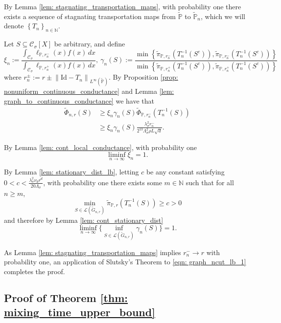 \documentclass[11pt,twoside]{article}
\newcommand{\set}[1]{\left\{#1\right\}}
\newcommand{\seq}[1]{\left\{#1\right\}_{n \in \mathbb{N}}}
\newcommand{\norm}[1]{\left\lVert#1\right\rVert}
\newcommand{\1}{\mathbf{1}}
\newcommand{\Xbf}{X}             %
\newcommand{\Pbb}{\mathbb{P}}
\newcommand{\Cset}{\mathcal{C}}
\newcommand{\Csig}{\Cset_{\sigma}}
\newcommand{\dx}{\,dx}
\newcommand{\piwt}{\widetilde{\pi}}
\begin{document}
By Lemma \ref{lem: stagnating_transportation_maps}, with probability one there exists a sequence of stagnating transportation maps from $\widetilde{\Pbb}$ to $\widetilde{\Pbb}_n$, which we will denote $\seq{T_n}$. 

Let $S \subseteq \Csig[\Xbf]$ be arbitrary, and define
\begin{equation*}
\xi_n := \frac{\int_{\Csig} \ell_{\Pbb,r_n^-}(x) f(x) \dx}{\int_{\Csig} \ell_{\Pbb,r_n^+}(x) f(x) \dx},~ \gamma_n(S) := \frac{\min \set{\piwt_{\Pbb,r_n^-}(T_n^{-1}(S^c)), \piwt_{\Pbb,r_n^-}(T_n^{-1}(S^c))} }{\min \set{\piwt_{\Pbb,r_n^+}(T_n^{-1}(S^c)), \piwt_{\Pbb,r_n^+}(T_n^{-1}(S^c))} } 
\end{equation*}
where $r_n^{\pm} := r \pm \norm{\mathrm{Id} - T_n}_{L^{\infty}(\widetilde{\Pbb})}$. By Proposition \ref{prop: nonuniform_continuous_conductance} and Lemma \ref{lem: graph_to_continuous_conductance} we have that
\begin{align}
\widetilde{\Phi}_{n,r}(S) & \geq \xi_n \gamma_n(S) \widetilde{\Phi}_{\Pbb,r_n^{-}}(T_n^{-1}(S)) \nonumber \\
& \geq  \xi_n \gamma_n(S) \frac{\lambda_{\sigma}^2r_n^{-}}{2^{13} \Lambda_{\sigma}^2 \rho L \sqrt{d}}. \label{eqn: graph_ncut_lb_1}
\end{align}

By Lemma \ref{lem: cont_local_conductance}, with probability one
\begin{equation*}
\liminf_{n \to \infty} \xi_n = 1.
\end{equation*}

By Lemma \ref{lem: stationary_dist_lb}, letting $c$ be any constant satisfying $0 < c < \frac{\lambda_{\sigma}^2 \nu_d r^d}{20\Lambda_{\sigma}}$, with probability one there exists some $m \in \mathbb{N}$ such that for all $n \geq m$,
\begin{equation*}
\min_{S \in \mathcal{L}(\widetilde{G}_{n,r})}\piwt_{\Pbb,r}(T_n^{-1}(S)) \geq c > 0
\end{equation*}
and therefore by Lemma \ref{lem: cont_stationary_dist}
\begin{equation*}
\liminf_{n \to \infty} \biggl\{ \inf_{S \in \mathcal{L}(\widetilde{G}_{n,r})} \gamma_n(S)\biggr\} = 1.
\end{equation*}

As Lemma \ref{lem: stagnating_transportation_maps} implies $r_n^{-} \to r$ with probability one, an application of Slutsky's Theorem to \eqref{eqn: graph_ncut_lb_1} completes the proof.

\subsection{Proof of Theorem \ref{thm: mixing_time_upper_bound}}
\label{sec: proof_of_theorem_mixing_time}
\end{document}
